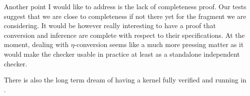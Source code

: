 Another point I would like to address is the lack of completeness proof.
Our tests suggest that we are close to completeness if not there yet for the
fragment we are considering. It would be however really interesting to have a
proof that conversion and inference are complete with respect to their
specifications.
At the moment, dealing with \(\eta\)-conversion seems like a much more pressing
matter as it would make the checker usable in practice at least as a standalone
independent checker.

There is also the long term dream of having a \Coq kernel fully verified and
running in \Coq.